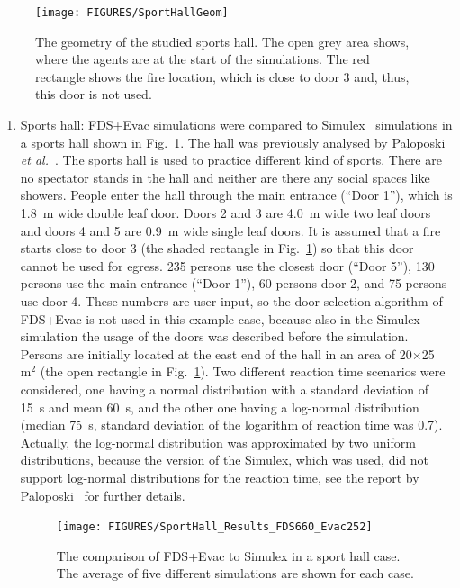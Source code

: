 \documentclass[12pt,a4paper,final,twoside]{stylevk}
\begin{document}
%
\begin{figure}[!b]
  \centerline{\texttt{[image: FIGURES/SportHallGeom]}} 
  \caption{The geometry of the studied sports hall.  The open grey
    area shows, where the agents are at the start of the simulations.
    The red rectangle shows the fire location, which is close to door
    3 and, thus, this door is not used.}\label{Fig_SportGeom}
\end{figure}
%

\begin{enumerate}
%
\item Sports hall: FDS+Evac simulations were compared to
  Simulex~\cite{Simulex96, Thompson95a, Thompson95b, Thompson03}
  simulations in a sports hall shown in Fig.~\ref{Fig_SportGeom}.
  The hall was previously analysed by Paloposki \emph{et
    al.}~\cite{Paloposki02}.  The sports hall is used to practice
  different kind of sports.  There are no spectator stands in the hall
  and neither are there any social spaces like showers.  People enter
  the hall through the main entrance (``Door 1''), which is 1.8~m wide
  double leaf door.  Doors 2 and 3 are 4.0~m wide two leaf doors and
  doors 4 and 5 are 0.9~m wide single leaf doors.  It is assumed that
  a fire starts close to door 3 (the shaded rectangle in
  Fig.~\ref{Fig_SportGeom}) so that this door cannot be used for
  egress.  235 persons use the closest door (``Door 5''), 130 persons
  use the main entrance (``Door 1''), 60 persons door 2, and 75
  persons use door 4.  These numbers are user input, so the door
  selection algorithm of FDS+Evac is not used in this example case,
  because also in the Simulex simulation the usage of the doors was
  described before the simulation.  Persons are initially located at
  the east end of the hall in an area of 20$\times$25~$\mathrm{m^2}$
  (the open rectangle in Fig.~\ref{Fig_SportGeom}).  Two different
  reaction time scenarios were considered, one having a normal
  distribution with a standard deviation of 15~s and mean 60~s, and
  the other one having a log-normal distribution (median 75~s,
  standard deviation of the logarithm of reaction time was 0.7).
  Actually, the log-normal distribution was approximated by two
  uniform distributions, because the version of the Simulex, which was
  used, did not support log-normal distributions for the reaction
  time, see the report by Paloposki~\cite{Paloposki02} for further
  details.

  \begin{figure}[!tb]
    \centerline{\texttt{[image: FIGURES/SportHall\_Results\_FDS660\_Evac252]}}
    \caption{The comparison of FDS+Evac to Simulex in a sport hall
      case.  The average of five different simulations are shown for
      each case.}\label{Fig_SportResults}
  \end{figure}


\end{enumerate}
\end{document}
